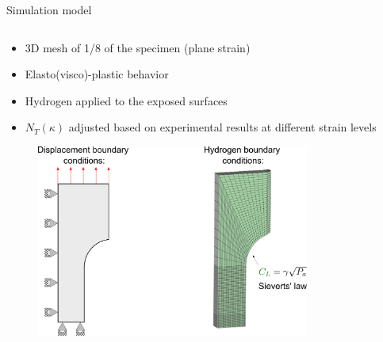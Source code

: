 \documentclass[9pt]{beamer}
\begin{document}

\begin{frame}{Simulation model}

\begin{columns}

\begin{column}{0.65\textwidth}

\begin{itemize}
	\item 3D mesh of 1/8 of the specimen (plane strain)
	\vspace{0.15cm}
	\item Elasto(visco)-plastic behavior
	\vspace{0.15cm}
	\item Hydrogen applied to the exposed surfaces
	\vspace{0.15cm}
	\item $N_T(\kappa)$ adjusted based on experimental results at different strain levels
\end{itemize}

	\vspace{0.25cm}

	\begin{figure}
		\centering
		\includegraphics[width=0.8\textwidth]{Images/TDS_BC.pdf} \\
	\end{figure}
	
	\vspace{0.15cm}

\end{column}


\end{columns}
\end{frame}
\end{document}
